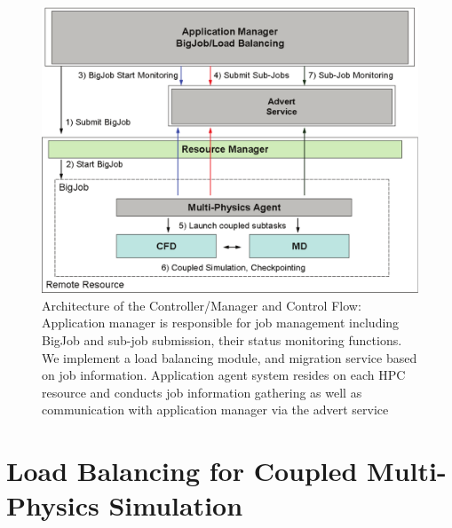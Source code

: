 \documentclass[conference,final]{IEEEtran}
\newcommand{\jhanote}[1]{ {\textcolor{red} { ***Jha: #1 }}}
\newcommand{\jhanote}[1]{}
\begin{document}
\begin{figure}
\centering
\includegraphics[scale=0.38]{Structure_of_BigJob}
\caption{\small Architecture of the Controller/Manager and Control
  Flow: Application manager is responsible for job management
  including BigJob and sub-job submission, their status monitoring
  functions. We implement a load balancing module, and migration
  service based on job information. Application agent system resides
  on each HPC resource and conducts job information gathering as well
  as communication with application manager via the advert service}
\label{Fig:BigJob_Structure}
\end{figure}

\section{Load Balancing for Coupled Multi-Physics Simulation}


\end{document}
